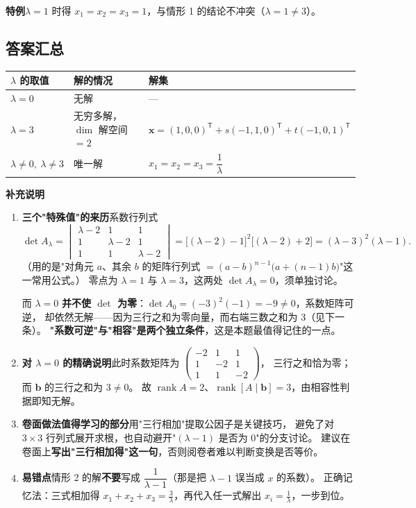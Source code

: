 \documentclass[10pt]{ctexart}
\newcommand{\rank}{\operatorname{rank}}
\newcommand{\TT}{^{\mathsf T}}
\newcommand{\bv}[1]{\begin{pmatrix}#1\end{pmatrix}}
\begin{document}
\textbf{特例}\quad $\lambda=1$ 时得 $x_1=x_2=x_3=1$，与情形 1 的结论不冲突（$\lambda=1\neq3$）。

\subsection*{答案汇总}
\begin{center}
\begin{tabular}{@{}lll@{}}
\toprule
$\lambda$ 的取值 & 解的情况 & 解集\\
\midrule
$\lambda=0$ & 无解 & —\\
$\lambda=3$ & 无穷多解，$\dim$ 解空间 $=2$ & $\mathbf x=(1,0,0)\TT+s(-1,1,0)\TT+t(-1,0,1)\TT$\\
$\lambda\neq0,\ \lambda\neq3$ & 唯一解 & $x_1=x_2=x_3=\dfrac{1}{\lambda}$\\
\bottomrule
\end{tabular}
\end{center}

\begin{supbox}
\textbf{补充说明}

\begin{enumerate}
\item \textbf{三个"特殊值"的来历}\quad 系数行列式
\[
\det A_\lambda=\begin{vmatrix}\lambda-2&1&1\\1&\lambda-2&1\\1&1&\lambda-2\end{vmatrix}
=\big[(\lambda-2)-1\big]^2\big[(\lambda-2)+2\big]=(\lambda-3)^2(\lambda-1).
\]
（用的是"对角元 $a$、其余 $b$ 的矩阵行列式 $=(a-b)^{n-1}\big(a+(n-1)b\big)$"这一常用公式。）
零点为 $\lambda=1$ 与 $\lambda=3$，这两处 $\det A_\lambda=0$，须单独讨论。

而 $\lambda=0$ \textbf{并不使 $\det$ 为零}：$\det A_0=(-3)^2(-1)=-9\neq0$，系数矩阵可逆，
却依然无解——因为三行之和为零向量，而右端三数之和为 $3$（见下一条）。
\textbf{"系数可逆"与"相容"是两个独立条件}，这是本题最值得记住的一点。

\item \textbf{对 $\lambda=0$ 的精确说明}\quad 此时系数矩阵为 $\bv{-2&1&1\\1&-2&1\\1&1&-2}$，
三行之和恰为零；而 $\mathbf b$ 的三行之和为 $3\neq0$。
故 $\rank A=2$、$\rank[A\mid\mathbf b]=3$，由相容性判据即知无解。

\item \textbf{卷面做法值得学习的部分}\quad 用"三行相加"提取公因子是关键技巧，
避免了对 $3\times3$ 行列式展开求根，也自动避开"$(\lambda-1)$ 是否为 $0$"的分支讨论。
建议在卷面上\textbf{写出"三行相加得"这一句}，否则阅卷者难以判断变换是否等价。

\item \textbf{易错点}\quad 情形 2 的解\textbf{不要}写成 $\dfrac{1}{\lambda-1}$（那是把 $\lambda-1$ 误当成 $x$ 的系数）。
正确记忆法：三式相加得 $x_1+x_2+x_3=\frac{3}{\lambda}$，再代入任一式解出 $x_i=\frac{1}{\lambda}$，一步到位。
\end{enumerate}
\end{supbox}
\end{document}
